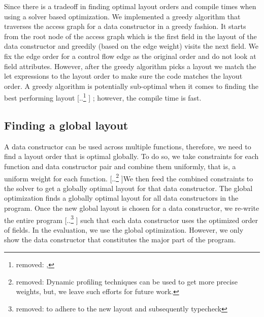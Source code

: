 \documentclass[acmsmall,review,anonymous]{acmart}\settopmatter{printfolios=true,printccs=false,printacmref=false}
\providecommand{\DIFaddtex}[1]{{\protect\color{blue} \sf #1}} %
\providecommand{\DIFdeltex}[1]{{\protect\color{red} [..\footnote{removed: #1} ]}} %
\providecommand{\DIFaddbegin}{} %
\providecommand{\DIFaddend}{} %
\providecommand{\DIFdelbegin}{} %
\providecommand{\DIFdelend}{} %
\providecommand{\DIFadd}[1]{\texorpdfstring{\DIFaddtex{#1}}{#1}} %
\providecommand{\DIFdel}[1]{\texorpdfstring{\DIFdeltex{#1}}{}} %
\newcommand{\DIFscaledelfig}{0.5}
\newlength{\DIFdelgraphicswidth} %
\newlength{\DIFdelgraphicsheight} %
\newcommand{\DIFaddincludegraphics}[2][]{{\color{blue}\fbox{\DIFOincludegraphics[#1]{#2}}}} %
\newcommand{\DIFdelincludegraphics}[2][]{%
\sbox{\DIFdelgraphicsbox}{\DIFOincludegraphics[#1]{#2}}%
\settoboxwidth{\DIFdelgraphicswidth}{\DIFdelgraphicsbox} %
\settoboxtotalheight{\DIFdelgraphicsheight}{\DIFdelgraphicsbox} %
\scalebox{\DIFscaledelfig}{%
\parbox[b]{\DIFdelgraphicswidth}{\usebox{\DIFdelgraphicsbox}\\[-\baselineskip] \rule{\DIFdelgraphicswidth}{0em}}\llap{\resizebox{\DIFdelgraphicswidth}{\DIFdelgraphicsheight}{%
\setlength{\unitlength}{\DIFdelgraphicswidth}%
\begin{picture}(1,1)%
\thicklines\linethickness{2pt} %
{\color[rgb]{1,0,0}\put(0,0){\framebox(1,1){}}}%
{\color[rgb]{1,0,0}\put(0,0){\line( 1,1){1}}}%
{\color[rgb]{1,0,0}\put(0,1){\line(1,-1){1}}}%
\end{picture}%
}\hspace*{3pt}}} %
} %
\DeclareRobustCommand{\DIFaddbegin}{\DIFOaddbegin \let\includegraphics\DIFaddincludegraphics} %
\DeclareRobustCommand{\DIFaddend}{\DIFOaddend \let\includegraphics\DIFOincludegraphics} %
\DeclareRobustCommand{\DIFdelbegin}{\DIFOdelbegin \let\includegraphics\DIFdelincludegraphics} %
\DeclareRobustCommand{\DIFdelend}{\DIFOaddend \let\includegraphics\DIFOincludegraphics} %
\begin{document}
Since there is a tradeoff in finding optimal layout orders and compile times when using a solver based optimization. We implemented a greedy algorithm that traverses the access graph for a data constructor
in a greedy fashion. It starts from the root node of the access graph which is the first field in the layout of the data constructor and greedily (based on the edge weight) visits the next field. 
We fix the edge order for a control flow edge as the original order and do not look at field attributes. However, after the greedy algorithm picks a layout we match the let expressions to the layout order to make sure the code matches the layout order. A greedy algorithm is potentially sub-optimal when it comes to finding the best performing layout\DIFdelbegin \DIFdel{, }\DIFdelend \DIFaddbegin \DIFadd{; }\DIFaddend however, the compile time is fast.



\subsection{Finding a global layout}
\label{design:global}

A data constructor can be used across multiple functions, therefore, we need to find a layout order that is optimal globally.
To do so, we take constraints for each function and data constructor pair and combine them uniformly, that is, a uniform weight for each function.
\DIFdelbegin \DIFdel{Dynamic profiling techniques can be used to get more precise weights, but, we leave such efforts for future work.
}\DIFdelend We then feed the combined constraints to the solver to get a globally optimal layout for that data constructor. The global optimization finds a globally optimal layout for all data constructors in the program. Once the new global layout is chosen for a data constructor, we re-write the 
entire program \DIFdelbegin \DIFdel{to adhere to the new layout and subsequently typecheck}\DIFdelend \DIFaddbegin \DIFadd{such that each data constructor uses the optimized order of fields}\DIFaddend .
In the evaluation, we use the global optimization. However, we only show the data constructor that constitutes the major part of the program.
\end{document}
